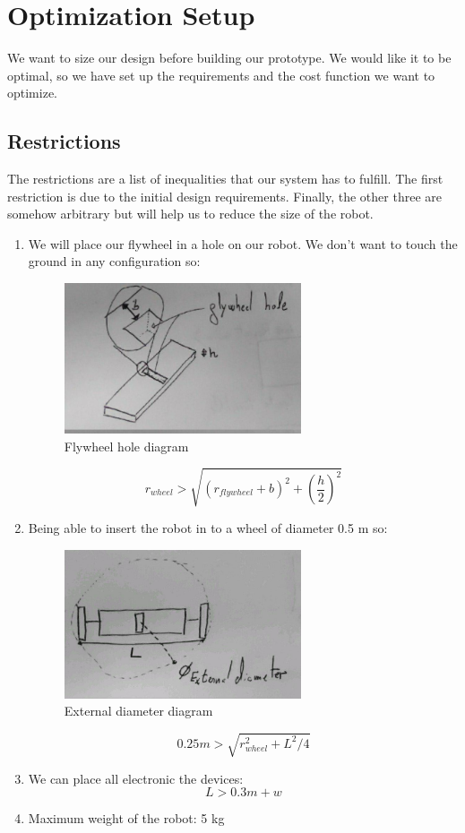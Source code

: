 \section{Optimization Setup}
We want to size our design before building our prototype. We would like it to be optimal, so 
we have set up the requirements and the cost function we want to optimize.

\subsection{Restrictions}
The restrictions are a list of inequalities that our system has to fulfill.
The first restriction is due to the initial design requirements. Finally, the other three are 
somehow arbitrary but will help us to reduce the size of the robot.
\begin{enumerate}
\item We will place our flywheel in a hole on our robot. We don't want to touch the ground
in any configuration so:
\begin{figure}[ht]
	\centering
	\includegraphics[width=7cm]{img/flywheel_hole.jpg}
	\caption{Flywheel hole diagram}
	\label{fig:Flywheel hole diagram}
\end{figure}
\[r_{wheel}> \sqrt{(r_{flywheel} + b)^2+(\frac{h}{2})^2}\]
\item Being able  to insert the robot in to a wheel of diameter 0.5 m so:
\begin{figure}[ht]
	\centering
	\includegraphics[width=7cm]{img/external_diameter.jpg}
	\caption{External diameter diagram}
	\label{fig:External diameter diagram}
\end{figure}
\[0.25 m > \sqrt{r_{wheel}^2 + L^2/4}\]
\item We can place all electronic the devices:
\[L > 0.3m + w \]
\item Maximum weight of the robot: 5 kg
\end{enumerate}

